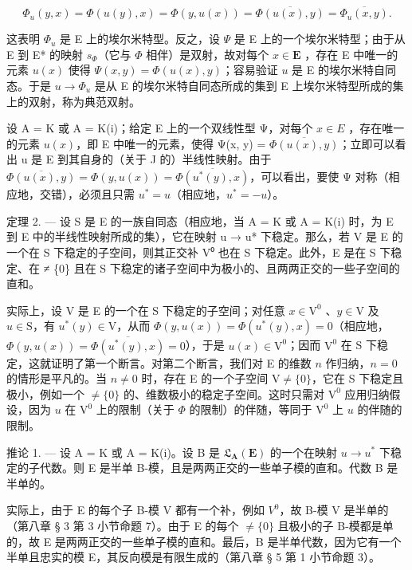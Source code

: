 \[
\Phi_ {u} (y, x) = \Phi (u (y), x) = \Phi (y, u (x)) = \overline {{\Phi (u (x) , y)}} = \overline {{\Phi_ {u} (x , y)}}.
\]

这表明 \(\Phi_{u}\) 是 E 上的埃尔米特型。反之，设 \(\Psi\) 是 E 上的一个埃尔米特型；由于从 E 到 E* 的映射 \(s_{\Phi}\)（它与 \(\Phi\) 相伴）是双射，故对每个 \(x \in \mathbf{E}\) ，存在 E 中唯一的元素 \(u(x)\) 使得 \(\Psi(x, y) = \Phi(u(x), y)\)；容易验证 \(u\) 是 E 的埃尔米特自同态。于是 \(u \to \Phi_{u}\) 是从 E 的埃尔米特自同态所成的集到 E 上埃尔米特型所成的集上的双射，称为典范双射。

设 A = K 或 A = K(i)；给定 E 上的一个双线性型 Ψ，对每个 \(x \in E\) ，存在唯一的元素 \(u(x)\)，即 E 中唯一的元素，使得 Ψ(x, y) = \(\overline{\Phi(u(x), y)}\)；立即可以看出 u 是 E 到其自身的（关于 J 的）半线性映射。由于 \(\overline{\Phi(u(x), y)} = \Phi(y, u(x)) = \overline{\Phi(u^{*}(y), x)}\)，可以看出，要使 Ψ 对称（相应地，交错），必须且只需 \(u^{*} = u\)（相应地，\(u^{*} = -u\)）。

定理 2. --- 设 S 是 E 的一族自同态（相应地，当 A = K 或 A = K(i) 时，为 E 到 E 中的半线性映射所成的集），它在映射 u → u* 下稳定。那么，若 V 是 E 的一个在 S 下稳定的子空间，则其正交补 V⁰ 也在 S 下稳定。此外，E 是在 S 下稳定、在 ≠ \{0\} 且在 S 下稳定的诸子空间中为极小的、且两两正交的一些子空间的直和。

实际上，设 V 是 E 的一个在 S 下稳定的子空间；对任意 \(x \in \mathrm{V}^0\) 、\(y \in \mathrm{V}\) 及 \(u \in \mathrm{S}\)，有 \(u^*(y) \in \mathrm{V}\)，从而 \(\Phi(y, u(x)) = \Phi(u^*(y), x) = 0\)（相应地，\(\Phi(y, u(x)) = \overline{\Phi(u^*(y), x)} = 0\)），于是 \(u(x) \in \mathrm{V}^0\)；因而 \(\mathrm{V}^0\) 在 S 下稳定，这就证明了第一个断言。对第二个断言，我们对 E 的维数 \(n\) 作归纳，\(n = 0\) 的情形是平凡的。当 \(n \neq 0\) 时，存在 E 的一个子空间 \(\mathrm{V} \neq \{0\}\)，它在 S 下稳定且极小，例如一个 \(\neq \{0\}\) 的、维数极小的稳定子空间。这时只需对 \(\mathrm{V}^0\) 应用归纳假设，因为 \(u\) 在 \(\mathrm{V}^0\) 上的限制（关于 \(\Phi\) 的限制）的伴随，等同于 \(\mathrm{V}^0\) 上 \(u\) 的伴随的限制。

推论 1. --- 设 A = K 或 A = K(i)。设 B 是 \(\mathfrak{L}_{\mathbf{A}}(\mathbf{E})\) 的一个在映射 \(u \to u^{*}\) 下稳定的子代数。则 E 是半单 B-模，且是两两正交的一些单子模的直和。代数 B 是半单的。

实际上，由于 E 的每个子 B-模 V 都有一个补，例如 \(V^{0}\)，故 B-模 V 是半单的（第八章 § 3 第 3 小节命题 7）。由于 E 的每个 \(\neq\{0\}\) 且极小的子 B-模都是单的，故 E 是两两正交的一些单子模的直和。最后，B 是半单代数，因为它有一个半单且忠实的模 E，其反向模是有限生成的（第八章 § 5 第 1 小节命题 3）。

